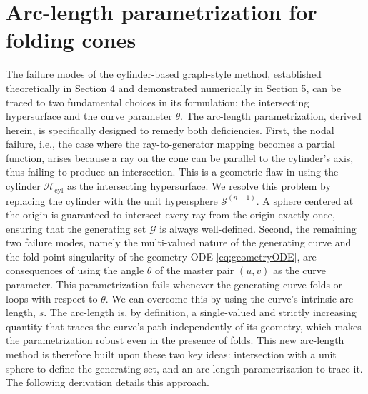 \documentclass[a4paper,9pt,parskip=half,english]{article}
\theoremstyle{plain}
\theoremstyle{definition}
\begin{document}
\section{Arc-length parametrization for folding cones}\label{Section_ArcLength}
The failure modes of the cylinder-based graph-style method, established theoretically in Section 4 and demonstrated numerically in Section 5, can be traced to two fundamental choices in its formulation: the intersecting hypersurface and the curve parameter $\theta$. The arc-length parametrization, derived herein, is specifically designed to remedy both deficiencies. 
First, the nodal failure, i.e., the case where the ray-to-generator mapping becomes a partial function, arises because a ray on the cone can be parallel to the cylinder's axis, thus failing to produce an intersection. This is a geometric flaw in using the cylinder $\mathcal{H}_{\textrm{cyl}}$ as the intersecting hypersurface. We resolve this problem by replacing the cylinder with the unit hypersphere $\mathcal{S}^{(n-1)}$. A sphere centered at the origin is guaranteed to intersect every ray from the origin exactly once, ensuring that the generating set $\mathcal{G}$ is always well-defined. 
Second, the remaining two failure modes, namely the multi-valued nature of the generating curve and the fold-point singularity of the geometry ODE \eqref{eq:geometryODE}, are consequences of using the angle $\theta$ of the master pair $(u,v)$ as the curve parameter. This parametrization fails whenever the generating curve folds or loops with respect to $\theta$. We can overcome this by using the curve's intrinsic arc-length, $s$. The arc-length is, by definition, a single-valued and strictly increasing quantity that traces the curve's path independently of its geometry, which makes the parametrization robust even in the presence of folds. 
This new arc-length method is therefore built upon these two key ideas: intersection with a unit sphere to define the generating set, and an arc-length parametrization to trace it. The following derivation details this approach. 
\end{document}
